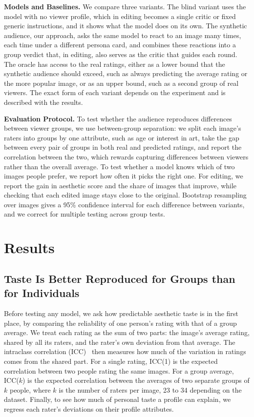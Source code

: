 \documentclass[runningheads]{llncs}
\begin{document}
\textbf{Models and Baselines.} We compare three variants. The blind variant uses the model with no viewer profile, which in editing becomes a single critic or fixed generic instructions, and it shows what the model does on its own. The synthetic audience, our approach, asks the same model to react to an image many times, each time under a different persona card, and combines these reactions into a group verdict that, in editing, also serves as the critic that guides each round. The oracle has access to the real ratings, either as a lower bound that the synthetic audience should exceed, such as always predicting the average rating or the more popular image, or as an upper bound, such as a second group of real viewers. The exact form of each variant depends on the experiment and is described with the results.

\textbf{Evaluation Protocol.} To test whether the audience reproduces differences between viewer groups, we use between-group separation: we split each image's raters into groups by one attribute, such as age or interest in art, take the gap between every pair of groups in both real and predicted ratings, and report the correlation between the two, which rewards capturing differences between viewers rather than the overall average. To test whether a model knows which of two images people prefer, we report how often it picks the right one. For editing, we report the gain in aesthetic score and the share of images that improve, while checking that each edited image stays close to the original. Bootstrap resampling over images gives a 95\% confidence interval for each difference between variants, and we correct for multiple testing across group tests.

\section{Results}

\subsection{Taste Is Better Reproduced for Groups than for Individuals}
\label{sec:ceiling}

Before testing any model, we ask how predictable aesthetic taste is in the first place, by comparing the reliability of one person's rating with that of a group average. We treat each rating as the sum of two parts: the image's average rating, shared by all its raters, and the rater's own deviation from that average. The intraclass correlation (ICC)~\cite{shrout1979} then measures how much of the variation in ratings comes from the shared part. For a single rating, ICC(1) is the expected correlation between two people rating the same images. For a group average, ICC($k$) is the expected correlation between the averages of two separate groups of $k$ people, where $k$ is the number of raters per image, 23 to 34 depending on the dataset. Finally, to see how much of personal taste a profile can explain, we regress each rater's deviations on their profile attributes.
\end{document}
